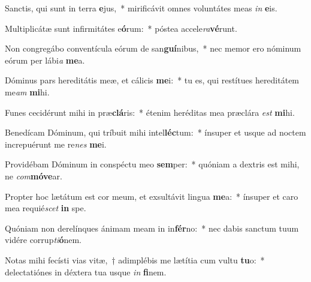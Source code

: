 \item Sanctis, qui sunt in terra \textbf{e}jus,~* mirificávit omnes voluntátes meas \textit{in} \textbf{e}is.
\item Multiplicátæ sunt infirmitátes e\textbf{ó}rum:~* póstea accele\textit{ra}\textbf{vé}runt.
\item Non congregábo conventícula eórum de san\textbf{guí}nibus,~* nec memor ero nóminum eórum per lábi\textit{a} \textbf{me}a.
\item Dóminus pars hereditátis meæ, et cálicis \textbf{me}i:~* tu es, qui restítues hereditátem me\textit{am} \textbf{mi}hi.
\item Funes cecidérunt mihi in præ\textbf{clá}ris:~* étenim heréditas mea præclára \textit{est} \textbf{mi}hi.
\item Benedícam Dóminum, qui tríbuit mihi intel\textbf{léc}tum:~* ínsuper et usque ad noctem increpuérunt me re\textit{nes} \textbf{me}i.
\item Providébam Dóminum in conspéctu meo \textbf{sem}per:~* quóniam a dextris est mihi, ne \textit{com}\textbf{mó}\textbf{ve}ar.
\item Propter hoc lætátum est cor meum, et exsultávit lingua \textbf{me}a:~* ínsuper et caro mea requié\textit{scet} \textbf{in} spe.
\item Quóniam non derelínques ánimam meam in in\textbf{fér}no:~* nec dabis sanctum tuum vidére corrup\textit{ti}\textbf{ó}nem.
\item Notas mihi fecísti vias vitæ,~† adimplébis me lætítia cum vultu \textbf{tu}o:~* delectatiónes in déxtera tua usque \textit{in} \textbf{fi}nem.
